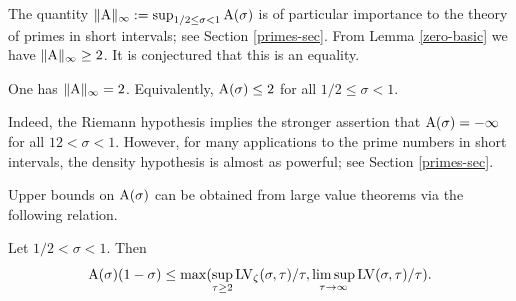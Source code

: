 The quantity $\|\mathrm{A}\|_\infty := \sup_{1/2 \leq \sigma < 1} \mathrm{A}(\sigma)$ is of particular importance to the theory of primes in short intervals; see Section \ref{primes-sec}.  From Lemma \ref{zero-basic} we have $\|\mathrm{A}\|_\infty \geq 2$.  It is conjectured that this is an equality.

\begin{conjecture}\label{density-hypothesis}  One has $\|\mathrm{A}\|_\infty=2$.  Equivalently, $\mathrm{A}(\sigma) \leq 2$ for all $1/2 \leq \sigma < 1$.
\end{conjecture}

Indeed, the Riemann hypothesis implies the stronger assertion that $\mathrm{A}(\sigma) = -\infty$ for all $12 < \sigma < 1$.  However, for many applications to the prime numbers in short intervals, the density hypothesis is almost as powerful; see Section \ref{primes-sec}.

Upper bounds on $\mathrm{A}(\sigma)$ can be obtained from large value theorems via the following relation.

\begin{lemma}\label{zero-from-large}  Let $1/2 < \sigma < 1$.  Then
$$ \mathrm{A}(\sigma)(1-\sigma) \leq \max( \sup_{\tau \geq 2} \mathrm{LV}_\zeta(\sigma,\tau)/\tau, \limsup_{\tau \to \infty} \mathrm{LV}(\sigma,\tau)/\tau ).$$
\end{lemma}

